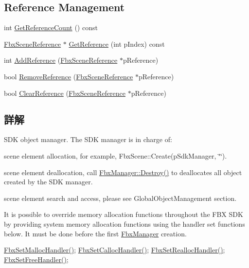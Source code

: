\subsection*{Reference Management}
\begin{DoxyCompactItemize}
\item 
int \hyperlink{class_fbx_manager_a361483c46708f864cfdf800ef1e3976e}{Get\+Reference\+Count} () const
\item 
\hyperlink{class_fbx_scene_reference}{Fbx\+Scene\+Reference} $\ast$ \hyperlink{class_fbx_manager_a2c99b023b62bfa5fee82328d1826762f}{Get\+Reference} (int p\+Index) const
\item 
int \hyperlink{class_fbx_manager_a955d69c7508979a9faec8d370a13cb8f}{Add\+Reference} (\hyperlink{class_fbx_scene_reference}{Fbx\+Scene\+Reference} $\ast$p\+Reference)
\item 
bool \hyperlink{class_fbx_manager_af69e9a08609d602bf5366f8a8cc4fdd3}{Remove\+Reference} (\hyperlink{class_fbx_scene_reference}{Fbx\+Scene\+Reference} $\ast$p\+Reference)
\item 
bool \hyperlink{class_fbx_manager_af3ae8fe5d18209a6101d4fab7565d273}{Clear\+Reference} (\hyperlink{class_fbx_scene_reference}{Fbx\+Scene\+Reference} $\ast$p\+Reference)
\end{DoxyCompactItemize}


\subsection{詳解}
S\+DK object manager. The S\+DK manager is in charge of\+: \begin{DoxyItemize}
\item scene element allocation, for example, Fbx\+Scene\+::\+Create(p\+Sdk\+Manager, \char`\"{}\char`\"{}). \item scene element deallocation, call \hyperlink{class_fbx_manager_aea778b97b3f0d13578ed0653a9e1212c}{Fbx\+Manager\+::\+Destroy()} to deallocates all object created by the S\+DK manager. \item scene element search and access, please see Global\+Object\+Management section.\end{DoxyItemize}
It is possible to override memory allocation functions throughout the F\+BX S\+DK by providing system memory allocation functions using the handler set functions below. It must be done before the first \hyperlink{class_fbx_manager}{Fbx\+Manager} creation.

\hyperlink{fbxalloc_8h_a2ad37389ed00ea52453f9bbdfbe21bf1}{Fbx\+Set\+Malloc\+Handler()}; \hyperlink{fbxalloc_8h_a1b129342da0077e10c027a6d7a1e5eeb}{Fbx\+Set\+Calloc\+Handler()}; \hyperlink{fbxalloc_8h_ae387334c73ede7effa5d05c3812a9b5c}{Fbx\+Set\+Realloc\+Handler()}; \hyperlink{fbxalloc_8h_a70cb4a74c71e880d8e87916aa40c7724}{Fbx\+Set\+Free\+Handler()};

